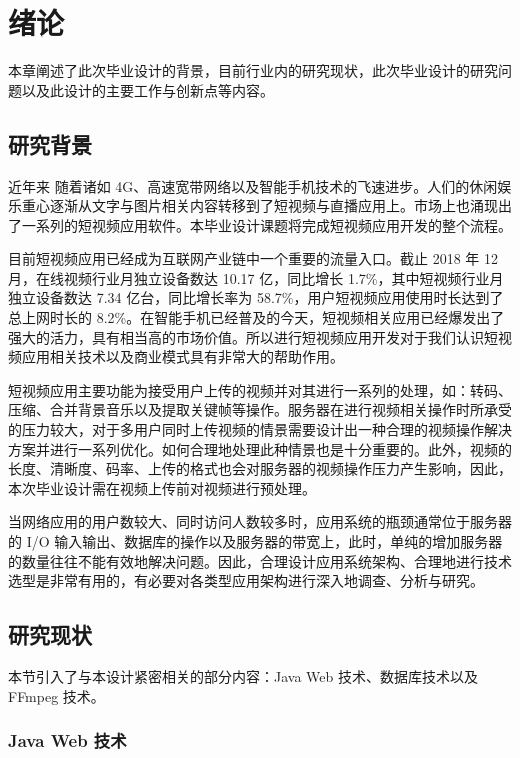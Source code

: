 \chapter{绪论}\label{sec:introduction}

本章阐述了此次毕业设计的背景，目前行业内的研究现状，此次毕业设计的研究问题以及此设计的主要工作与创新点等内容。

\section{研究背景}

近年来 随着诸如 4G、高速宽带网络以及智能手机技术的飞速进步。人们的休闲娱乐重心逐渐从文字与图片相关内容转移到了短视频与直播应用上。市场上也涌现出了一系列的短视频应用软件。本毕业设计课题将完成短视频应用开发的整个流程。

目前短视频应用已经成为互联网产业链中一个重要的流量入口。截止 2018 年 12 月，在线视频行业月独立设备数达 10.17 亿，同比增长 1.7\%，其中短视频行业月独立设备数达 7.34 亿台，同比增长率为 58.7\%，用户短视频应用使用时长达到了总上网时长的 8.2\%\cite{中国互联网络信息中心2018第}。在智能手机已经普及的今天，短视频相关应用已经爆发出了强大的活力，具有相当高的市场价值。所以进行短视频应用开发对于我们认识短视频应用相关技术以及商业模式具有非常大的帮助作用。

短视频应用主要功能为接受用户上传的视频并对其进行一系列的处理，如：转码、压缩、合并背景音乐以及提取关键帧等操作。服务器在进行视频相关操作时所承受的压力较大，对于多用户同时上传视频的情景需要设计出一种合理的视频操作解决方案并进行一系列优化。如何合理地处理此种情景也是十分重要的。此外，视频的长度、清晰度、码率、上传的格式也会对服务器的视频操作压力产生影响，因此，本次毕业设计需在视频上传前对视频进行预处理。

当网络应用的用户数较大、同时访问人数较多时，应用系统的瓶颈通常位于服务器的 I/O 输入输出、数据库的操作以及服务器的带宽上，此时，单纯的增加服务器的数量往往不能有效地解决问题\cite{rosenfeld2002information}。因此，合理设计应用系统架构、合理地进行技术选型是非常有用的，有必要对各类型应用架构进行深入地调查、分析与研究。

\section{研究现状}
本节引入了与本设计紧密相关的部分内容：Java Web 技术、数据库技术以及 FFmpeg 技术。

\subsection{Java Web 技术}

